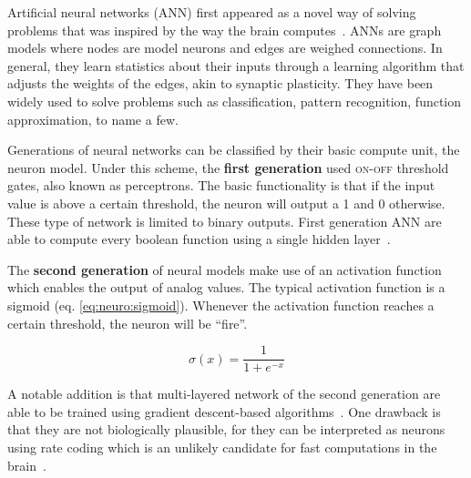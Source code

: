 Artificial neural networks (ANN) first appeared as a novel way of solving problems that was inspired by the way the brain computes~\cite{mcculloch1943logical}. ANNs are graph models where nodes are model neurons and edges are weighed connections. In general, they learn statistics about their inputs through a learning algorithm that adjusts the weights of the edges, akin to synaptic plasticity. They have been widely used to solve problems such as classification, pattern recognition, function approximation, to name a few.

Generations of neural networks can be classified by their basic compute unit, the neuron model. Under this scheme, the \textbf{first generation} used \textsc{on-off} threshold gates, also known as perceptrons. The basic functionality is that if the input value is above a certain threshold, the neuron will output a 1 and 0 otherwise. These type of network is limited to binary outputs. First generation ANN are able to compute every boolean function using a single hidden layer~\cite{third-gen-nn-Maass1997}.

The \textbf{second generation} of neural models make use of an activation function which enables the output of analog values. The typical activation function is a sigmoid (eq. \ref{eq:neuro:sigmoid}). Whenever the activation function reaches a certain threshold, the neuron will be ``fire''.

\begin{equation}
  \sigma(x) = \frac{1}{1 + e^{-x}}
  \label{eq:neuro:sigmoid}
\end{equation}

A notable addition is that multi-layered network of the second generation are able to be trained using gradient descent-based algorithms~\cite{hecht1989-backprop-theory}. One drawback is that they are not biologically plausible, for they can be interpreted as neurons using rate coding which is an unlikely candidate for fast computations in the brain~\cite{third-gen-nn-Maass1997}.

